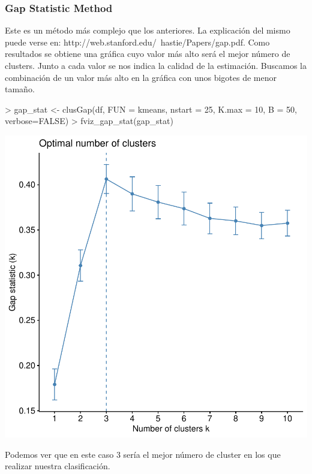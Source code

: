 \documentclass [a4paper] {article}
\begin{document}
\subsubsection{Gap Statistic Method}
Este es un método más complejo que los anteriores. La explicación del mismo puede verse en: http://web.stanford.edu/~hastie/Papers/gap.pdf.
Como resultados se obtiene una gráfica cuyo valor más alto será el mejor número de clusters.
Junto a cada valor se nos indica la calidad de la estimación.
Buscamos la combinación de un valor más alto en la gráfica con unos bigotes de menor tamaño.
\begin{center}
\begin{Schunk}
\begin{Sinput}
> gap_stat <- clusGap(df, FUN = kmeans, nstart = 25, K.max = 10, B = 50, verbose=FALSE)
> fviz_gap_stat(gap_stat)
\end{Sinput}
\end{Schunk}
\includegraphics{entrega-optimal_number_of_clusters_5}
\end{center}

Podemos ver que en este caso 3 sería el mejor número de cluster en los que realizar nuestra clasificación.
\end{document}
